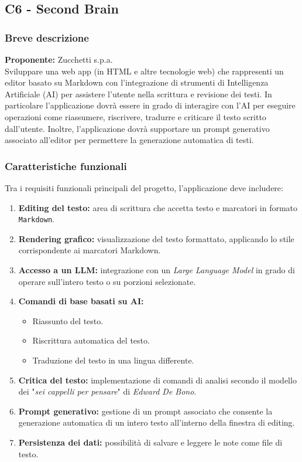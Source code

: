 \documentclass[a4paper,11pt]{article}
\begin{document}
\subsection{C6 - Second Brain}

\subsubsection{Breve descrizione}
\textbf{Proponente:} Zucchetti s.p.a.
\vspace{0.5em}\\
Sviluppare una web app (in HTML e altre tecnologie web) che rappresenti un editor basato su Markdown con l'integrazione di strumenti di Intelligenza Artificiale (AI) per assistere l'utente nella scrittura e revisione dei testi.
In particolare l'applicazione dovrà essere in grado di interagire con l'AI per eseguire operazioni come riassumere, riscrivere, tradurre e criticare il testo scritto dall'utente. Inoltre, l'applicazione dovrà supportare un prompt generativo associato all'editor per permettere la generazione automatica di testi.
\subsubsection{Caratteristiche funzionali}
Tra i requisiti funzionali principali del progetto, l'applicazione deve includere:
\begin{enumerate}[noitemsep, topsep=0pt]
 \item \textbf{Editing del testo:} area di scrittura che accetta testo e marcatori in formato \texttt{Markdown}.
 \item \textbf{Rendering grafico:} visualizzazione del testo formattato, applicando lo stile corrispondente ai marcatori Markdown.
 \item \textbf{Accesso a un LLM:} integrazione con un \textit{Large Language Model} in grado di operare sull'intero testo o su porzioni selezionate.
 \item \textbf{Comandi di base basati su AI:}
 \begin{itemize}
  \item Riassunto del testo.
  \item Riscrittura automatica del testo.
  \item Traduzione del testo in una lingua differente.
 \end{itemize}
 
 \item \textbf{Critica del testo:} implementazione di comandi di analisi secondo il modello dei "\textit{sei cappelli per pensare}" di \textit{Edward De Bono}.
 \item \textbf{Prompt generativo:} gestione di un prompt associato che consente la generazione automatica di un intero testo all'interno della finestra di editing.
 \item \textbf{Persistenza dei dati:} possibilità di salvare e leggere le note come file di testo.
\end{enumerate}
\end{document}
